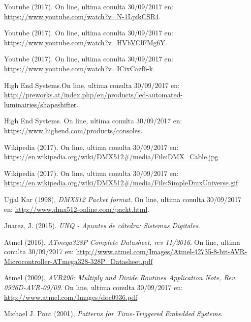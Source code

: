 \begin{thebibliography}{9}
	 Youtube (2017). On line, ultima conulta 30/09/2017 en: \url{https://www.youtube.com/watch?v=N-1LpikCSR4}.
	
	 Youtube (2017). On line, ultima conulta 30/09/2017 en: \url{https://www.youtube.com/watch?v=HVhVClFMg6Y}. 
	
	 Youtube (2017). On line, ultima conulta 30/09/2017 en: \url{https://www.youtube.com/watch?v=ICixCazf6-k}.
	
	 High End Systems.On line, ultima conulta 30/09/2017 en: \url{http://preworks.at/index.php/en/products/led-automated-luminairies/shapeshifter}.
	
	 High End Systems. On line, ultima conulta 30/09/2017 en: \url{https://www.highend.com/products/consoles}.
	
	 Wikipedia (2017). On line, ultima conulta 30/09/2017 en: \url{https://en.wikipedia.org/wiki/DMX512#/media/File:DMX_Cable.jpg}
	
	 Wikipedia (2017). On line, ultima conulta 30/09/2017 en: \url{https://en.wikipedia.org/wiki/DMX512#/media/File:SimpleDmxUniverse.gif}
	
	 Ujjal Kar (1998), \textit{DMX512 Packet format}. On line, ultima conulta 30/09/2017 en: \url{http://www.dmx512-online.com/packt.html}.
	
	 Juarez, J. (2015). \textit{UNQ - Apuntes de cátedra: Sistemas Digitales}.
	
	 Atmel (2016), \textit{ATmega328P Complete Datasheet, rev 11/2016}. On line, ultima conulta 30/09/2017 en: \url{http://www.atmel.com/Images/Atmel-42735-8-bit-AVR-Microcontroller-ATmega328-328P_Datasheet.pdf}
	
	 Atmel (2009), \textit{AVR200: Multiply and Divide Routines Application Note, Rev. 0936D-AVR-09/09}. On line, ultima conulta 30/09/2017 en: \href{http://www.atmel.com/Images/doc0936.pdf}{http://www.atmel.com/Images/doc0936.pdf}
	
	 Michael J. Pont (2001), \textit{Patterns for Time-Triggered Embedded Systems}. 
	
\end{thebibliography}